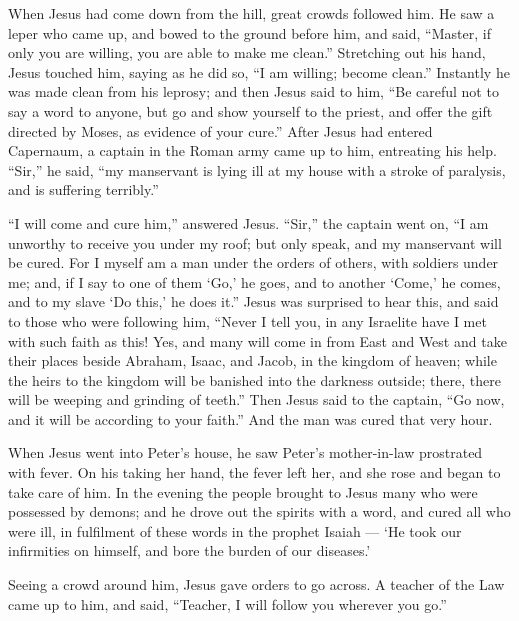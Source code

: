  When Jesus had come down from the hill, great crowds
followed him.  He saw a leper who came up, and bowed to the
ground before him, and said, ``Master, if only you are willing, you are
able to make me clean.''  Stretching out his hand, Jesus
touched him, saying as he did so, ``I am willing; become clean.''
Instantly he was made clean from his leprosy;  and then
Jesus said to him, ``Be careful not to say a word to anyone, but go and
show yourself to the priest, and offer the gift directed by Moses, as
evidence of your cure.''  After Jesus had entered Capernaum,
a captain in the Roman army came up to him, entreating his help.
 ``Sir,'' he said, ``my manservant is lying ill at my house
with a stroke of paralysis, and is suffering terribly.''

 ``I will come and cure him,'' answered Jesus. 
``Sir,'' the captain went on, ``I am unworthy to receive you under my
roof; but only speak, and my manservant will be cured.  For
I myself am a man under the orders of others, with soldiers under me;
and, if I say to one of them `Go,' he goes, and to another `Come,' he
comes, and to my slave `Do this,' he does it.''  Jesus was
surprised to hear this, and said to those who were following him,
``Never I tell you, in any Israelite have I met with such faith as this!
 Yes, and many will come in from East and West and take
their places beside Abraham, Isaac, and Jacob, in the kingdom of heaven;
 while the heirs to the kingdom will be banished into the
darkness outside; there, there will be weeping and grinding of teeth.''
 Then Jesus said to the captain, ``Go now, and it will be
according to your faith.'' And the man was cured that very hour.

 When Jesus went into Peter's house, he saw Peter's
mother-in-law prostrated with fever.  On his taking her
hand, the fever left her, and she rose and began to take care of him.
 In the evening the people brought to Jesus many who were
possessed by demons; and he drove out the spirits with a word, and cured
all who were ill,  in fulfilment of these words in the
prophet Isaiah --- `He took our infirmities on himself, and bore the
burden of our diseases.'

 Seeing a crowd around him, Jesus gave orders to go across.
 A teacher of the Law came up to him, and said, ``Teacher,
I will follow you wherever you go.''

